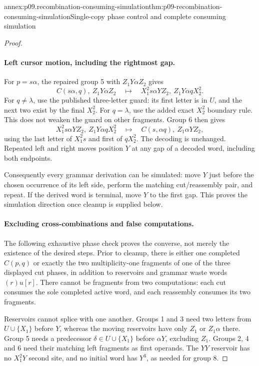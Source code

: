 \begin{annexitem}{annex:p09.recombination-consuming-simulation}{thm:p09-recombination-consuming-simulation}{Single-copy phase control and complete consuming simulation}
\begin{proof}
\paragraph{Left cursor motion, including the rightmost gap.}
For \(p=s\alpha\), the repaired group 5 with \(Z_1Y\alpha Z_2\) gives
\[
 C(s\alpha,q),\ Z_1Y\alpha Z_2
 \quad\longmapsto\quad
 X_1^2s\alpha YZ_2,\ Z_1Y\alpha qX_2^2.
\]
For \(q\ne\lambda\), use the published three-letter guard: its first
letter is in \(U\), and the next two exist by the final \(X_2^2\).
For \(q=\lambda\), use the added exact \(X_2^2\) boundary rule.
This does not weaken the guard on other fragments. Group 6 then gives
\[
 X_1^2s\alpha YZ_2,\ Z_1Y\alpha qX_2^2
 \quad\longmapsto\quad
 C(s,\alpha q),\ Z_1\alpha YZ_2,
\]
using the last letter of \(X_1^2s\) and first of \(qX_2^2\).
The decoding is unchanged. Repeated left and right moves position \(Y\)
at any gap of a decoded word, including both endpoints.

Consequently every grammar derivation can be simulated: move \(Y\) just
before the chosen occurrence of its left side, perform the matching
cut/reassembly pair, and repeat. If the derived word is terminal, move
\(Y\) to the first gap. This proves the simulation direction once cleanup
is supplied below.

\paragraph{Excluding cross-combinations and false computations.}
The following exhaustive phase check proves the converse, not merely the
existence of the desired steps. Prior to cleanup, there is either one
completed \(C(p,q)\) or exactly the two multiplicity-one fragments of one
of the three displayed cut phases, in addition to reservoirs and grammar
waste words \((r)u[r]\). There cannot be fragments from two computations:
each cut consumes the sole completed active word, and each reassembly
consumes its two fragments.

Reservoirs cannot splice with one another. Groups 1 and 3 need two letters
from \(U\cup\{X_1\}\) before \(Y\), whereas the moving reservoirs have
only \(Z_1\) or \(Z_1\alpha\) there. Group 5 needs a predecessor
\(\delta\in U\cup\{X_1\}\) before \(\alpha Y\), excluding \(Z_1\).
Groups 2, 4 and 6 need their matching left fragments as first operands.
The \(YY\) reservoir has no \(X_1^2Y\) second site, and no initial
word has \(Y^3\), as needed for group 8.


\end{proof}
\end{annexitem}
